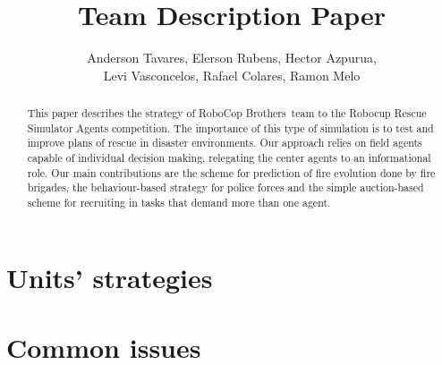 \documentclass[12pt]{article}
\title{\teamname Team Description Paper}
\author{Anderson Tavares, Elerson Rubens, Hector Azpurua,\\ Levi Vasconcelos, Rafael Colares, Ramon Melo\inst{1}}
\newcommand{\teamname}{RoboCop Brothers~}
\begin{document}
\maketitle

\begin{abstract}
This paper describes the strategy of \teamname team to the Robocup Rescue Simulator Agents competition. The importance of this type of simulation is to test and improve plans of rescue in disaster environments. Our approach relies on field agents capable of individual decision making, relegating the center agents to an informational role. Our main contributions are the scheme for prediction of fire evolution done by fire brigades, the behaviour-based strategy for police forces and the simple auction-based scheme for recruiting in tasks that demand more than one agent.
\end{abstract}



\section{Units' strategies}
\label{sec:strategies}









\section{Common issues}
\label{sec:common}









\end{document}
